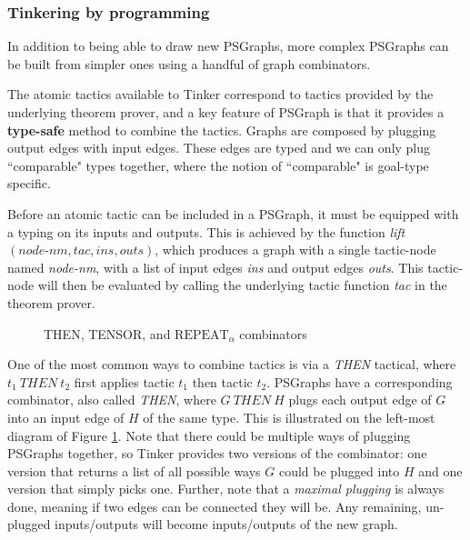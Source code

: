 \documentclass[submission,copyright,creativecommons]{eptcs}
\begin{document}
\subsubsection{Tinkering by programming}

In addition to being able to draw new PSGraphs, more complex PSGraphs can be built from simpler ones using a handful of graph combinators.

The atomic tactics available to Tinker correspond to tactics provided by the underlying theorem prover, and a key feature of PSGraph is that it provides a \textbf{type-safe} method to combine the tactics. Graphs are composed by plugging output edges with input edges. These edges are typed and we can only plug ``comparable" types together, where the notion of ``comparable" is goal-type specific. 

Before an atomic tactic can be included in a PSGraph, it must be equipped with a typing on its inputs and outputs. This is achieved by the function \textit{lift}$(\textit{node-nm},\textit{tac},\textit{ins},\textit{outs})$, which produces a graph with a single tactic-node named \textit{node-nm}, with a list of input edges \textit{ins} and output edges \textit{outs}. This tactic-node will then be evaluated by calling the underlying tactic function \textit{tac} in the theorem prover.

\begin{figure}[h]
  \centering
    \vspace{-7pt}
  \caption{\label{fig:then-and-tensor} THEN, TENSOR, and $\textrm{REPEAT}_\alpha$ combinators}
\end{figure}

One of the most common ways to combine tactics is via a \emph{THEN} tactical, where $t_1~\textit{THEN}~t_2$ first applies tactic $t_1$ then tactic $t_2$. PSGraphs have a corresponding combinator, also called \textit{THEN}, where $G~\textit{THEN}~H$ plugs each output edge of $G$ into an input edge of $H$ 
of the same type. This is illustrated on the left-most diagram of Figure  \ref{fig:then-and-tensor}. Note that there could be multiple ways of plugging PSGraphs together, so Tinker provides two versions of the combinator: one version that returns a list of all possible ways $G$ could be plugged into $H$ and one version that simply picks one. Further, note that a \emph{maximal plugging} is always done, meaning if two edges can be connected they will be. Any remaining, un-plugged inputs/outputs will become inputs/outputs of the new graph.
\end{document}
